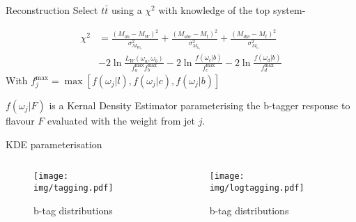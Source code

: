 \documentclass{beamer}
\begin{document}
%

\begin{frame}{Reconstruction}
Select $t\bar{t}$ using a $\chi^2$ with knowledge of the top system-

\begin{equation}\begin{split}
  \chi^2 &= \frac{\left(M_{ab} - M_W\right)^2}{\sigma^2_{M_{W_h}}} + \frac{\left(M_{abc} - M_t\right)^2}{\sigma^2_{M_{t_h}}} + \frac{\left(M_{dl\nu} - M_t\right)^2}{\sigma^2_{M_{t_l}}} \\
  &-2\ln{\frac{L_{W}\left( \omega_{a},\omega_{b} \right)}{f^{\text{max}}_{a} f^{\text{max}}_{b}}} -2\ln{\frac{f\left(\omega_{c} \big| b\right)}{f^{\text{max}}_{c}}} -2\ln{\frac{f\left(\omega_{d} \big| b\right)}{f^{\text{max}}_{d}}}
\end{split}\end{equation}
With $f^{\text{max}}_j = \max\left[f\left(\omega_{j} \big| l\right), f\left(\omega_{j} \big| c\right), f\left(\omega_{j} \big| b\right)\right]$

$f\left( \omega_{j} \big| F\right)$ is a Kernal Density Estimator parameterising the b-tagger response to flavour $F$ evaluated with the weight from jet $j$.
\end{frame}

\begin{frame}{KDE parameterisation}
  \begin{columns}
    \begin{column}{0.45\textwidth}\begin{figure}
      \caption{b-tag distributions}
      \texttt{[image: img/tagging.pdf]}
    \end{figure}\end{column}
    \begin{column}{0.45\textwidth}\begin{figure}
      \caption{b-tag distributions}
      \texttt{[image: img/logtagging.pdf]}
    \end{figure}\end{column}
  \end{columns}
\end{frame}
\end{document}
